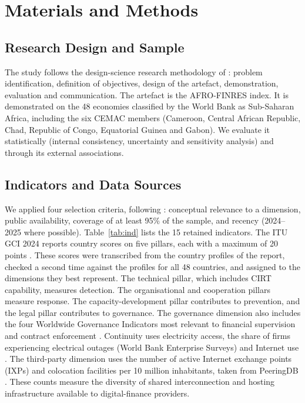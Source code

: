 \documentclass[fintech,article,submit,pdftex,moreauthors]{Definitions/mdpi}
\begin{document}
\section{Materials and Methods}\label{sec:methods}

\subsection{Research Design and Sample}

The study follows the design-science research methodology of \citet{Peffers2007}: problem identification, definition of objectives, design of the artefact, demonstration, evaluation and communication. The artefact is the AFRO-FINRES index. It is demonstrated on the 48 economies classified by the World Bank as Sub-Saharan Africa, including the six CEMAC members (Cameroon, Central African Republic, Chad, Republic of Congo, Equatorial Guinea and Gabon). We evaluate it statistically (internal consistency, uncertainty and sensitivity analysis) and through its external associations.

\subsection{Indicators and Data Sources}

We applied four selection criteria, following \citet{OECD2008}: conceptual relevance to a dimension, public availability, coverage of at least 95\% of the sample, and recency (2024--2025 where possible). Table~\ref{tab:ind} lists the 15 retained indicators. The ITU GCI 2024 reports country scores on five pillars, each with a maximum of 20 points \citep{ITU2024GCI}. These scores were transcribed from the country profiles of the report, checked a second time against the profiles for all 48 countries, and assigned to the dimensions they best represent. The technical pillar, which includes CIRT capability, measures detection. The organisational and cooperation pillars measure response. The capacity-development pillar contributes to prevention, and the legal pillar contributes to governance. The governance dimension also includes the four Worldwide Governance Indicators most relevant to financial supervision and contract enforcement \citep{Kaufmann2011,WB2025WGI}. Continuity uses electricity access, the share of firms experiencing electrical outages (World Bank Enterprise Surveys) and Internet use \citep{WBWDI}. The third-party dimension uses the number of active Internet exchange points (IXPs) and colocation facilities per 10 million inhabitants, taken from PeeringDB \citep{PeeringDB2026}. These counts measure the diversity of shared interconnection and hosting infrastructure available to digital-finance providers.
\end{document}

